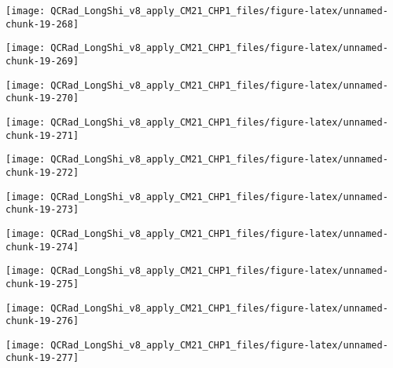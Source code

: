 \documentclass[
  10pt,
  a4paper,oneside]{article}
\begin{document}
\begin{center}\texttt{[image: QCRad\_LongShi\_v8\_apply\_CM21\_CHP1\_files/figure-latex/unnamed-chunk-19-268]} \end{center}

\begin{center}\texttt{[image: QCRad\_LongShi\_v8\_apply\_CM21\_CHP1\_files/figure-latex/unnamed-chunk-19-269]} \end{center}

\begin{center}\texttt{[image: QCRad\_LongShi\_v8\_apply\_CM21\_CHP1\_files/figure-latex/unnamed-chunk-19-270]} \end{center}

\begin{center}\texttt{[image: QCRad\_LongShi\_v8\_apply\_CM21\_CHP1\_files/figure-latex/unnamed-chunk-19-271]} \end{center}

\begin{center}\texttt{[image: QCRad\_LongShi\_v8\_apply\_CM21\_CHP1\_files/figure-latex/unnamed-chunk-19-272]} \end{center}

\begin{center}\texttt{[image: QCRad\_LongShi\_v8\_apply\_CM21\_CHP1\_files/figure-latex/unnamed-chunk-19-273]} \end{center}

\begin{center}\texttt{[image: QCRad\_LongShi\_v8\_apply\_CM21\_CHP1\_files/figure-latex/unnamed-chunk-19-274]} \end{center}

\begin{center}\texttt{[image: QCRad\_LongShi\_v8\_apply\_CM21\_CHP1\_files/figure-latex/unnamed-chunk-19-275]} \end{center}

\begin{center}\texttt{[image: QCRad\_LongShi\_v8\_apply\_CM21\_CHP1\_files/figure-latex/unnamed-chunk-19-276]} \end{center}

\begin{center}\texttt{[image: QCRad\_LongShi\_v8\_apply\_CM21\_CHP1\_files/figure-latex/unnamed-chunk-19-277]} \end{center}
\end{document}
